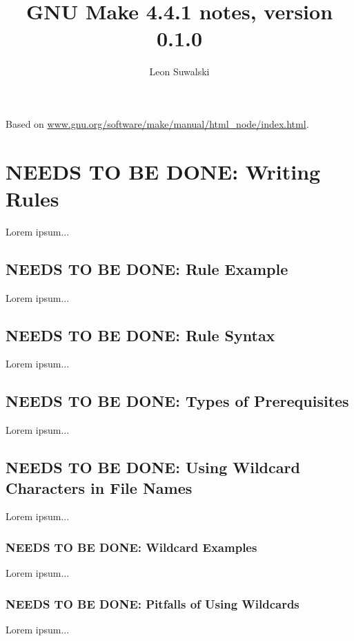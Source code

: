 \documentclass{charun}
\title{GNU Make 4.4.1 notes, version 0.1.0}
\author{Leon Suwalski}
\begin{document}
\begin{multicols*}{2}
\maketitle
\raggedright

Based on \url{www.gnu.org/software/make/manual/html_node/index.html}.





\color{gray}
\section{NEEDS TO BE DONE: Writing Rules}
Lorem ipsum...
\color{black}


\color{gray}
\subsection{NEEDS TO BE DONE: Rule Example}
Lorem ipsum...
\color{black}

\color{gray}
\subsection{NEEDS TO BE DONE: Rule Syntax}
Lorem ipsum...
\color{black}

\color{gray}
\subsection{NEEDS TO BE DONE: Types of Prerequisites}
Lorem ipsum...
\color{black}

\color{gray}
\subsection{NEEDS TO BE DONE: Using Wildcard Characters in File Names}
Lorem ipsum...
\color{black}

\color{gray}
\subsubsection{NEEDS TO BE DONE: Wildcard Examples}
Lorem ipsum...
\color{black}

\color{gray}
\subsubsection{NEEDS TO BE DONE: Pitfalls of Using Wildcards}
Lorem ipsum...
\color{black}


\end{multicols*}
\end{document}
